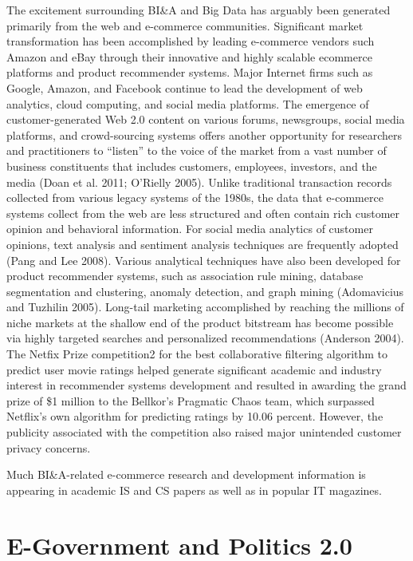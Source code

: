 The excitement surrounding BI\&A and Big Data has arguably
been generated primarily from the web and e-commerce
communities. Significant market transformation has been
accomplished by leading e-commerce vendors such Amazon
and eBay through their innovative and highly scalable ecommerce
platforms and product recommender systems.
Major Internet firms such as Google, Amazon, and Facebook
continue to lead the development of web analytics, cloud
computing, and social media platforms. The emergence of
customer-generated Web 2.0 content on various forums,
newsgroups, social media platforms, and crowd-sourcing
systems offers another opportunity for researchers and practitioners to “listen” to the voice of the market from a vast
number of business constituents that includes customers, employees,
investors, and the media (Doan et al. 2011; O’Rielly
2005). Unlike traditional transaction records collected from
various legacy systems of the 1980s, the data that e-commerce
systems collect from the web are less structured and often
contain rich customer opinion and behavioral information.
For social media analytics of customer opinions, text analysis
and sentiment analysis techniques are frequently adopted
(Pang and Lee 2008). Various analytical techniques have also
been developed for product recommender systems, such as
association rule mining, database segmentation and clustering,
anomaly detection, and graph mining (Adomavicius and
Tuzhilin 2005). Long-tail marketing accomplished by
reaching the millions of niche markets at the shallow end of
the product bitstream has become possible via highly targeted
searches and personalized recommendations (Anderson
2004).
The Netfix Prize competition2
for the best collaborative
filtering algorithm to predict user movie ratings helped generate
significant academic and industry interest in recommender
systems development and resulted in awarding the grand prize
of \$1 million to the Bellkor’s Pragmatic Chaos team, which
surpassed Netflix’s own algorithm for predicting ratings by
10.06 percent. However, the publicity associated with the
competition also raised major unintended customer privacy
concerns.

Much BI\&A-related e-commerce research and development
information is appearing in academic IS and CS papers as
well as in popular IT magazines.

\section*{E-Government and Politics 2.0}

